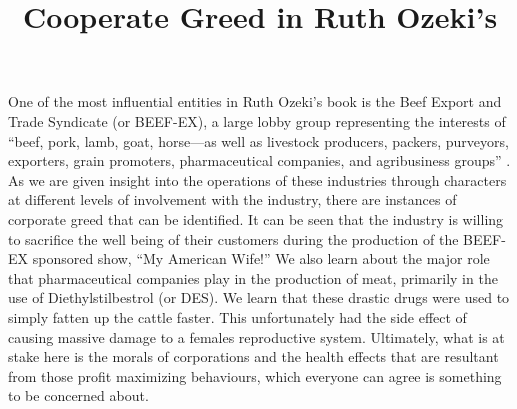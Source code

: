 \documentclass{article}
\title{Cooperate Greed in Ruth Ozeki's \citetitle{ozeki1998my}}
\begin{document}
\makeheader

One of the most influential entities in Ruth Ozeki's book
 is the Beef Export and Trade Syndicate (or BEEF-EX),
a large lobby group representing the interests of ``beef, pork, lamb, goat,
horse—as well as livestock producers, packers, purveyors, exporters, grain
promoters, pharmaceutical companies, and agribusiness groups''
\cite[Ch. 1]{ozeki1998my}. As we are given insight into the operations of these
industries through characters at different levels of involvement with the
industry, there are instances of corporate greed that can be identified. It
can be seen that the industry is willing to sacrifice the well being of
their customers during the production of the BEEF-EX sponsored show, ``My
American Wife!'' We also learn about the major role that pharmaceutical
companies play in the production of meat, primarily in the use of
Diethylstilbestrol (or DES). We learn that these drastic drugs were used to
simply fatten up the cattle faster. This unfortunately had the side effect
of causing massive damage to a females reproductive system. Ultimately, what
is at stake here is the morals of corporations and the health effects that
are resultant from those profit maximizing behaviours, which everyone can
agree is something to be concerned about.

\end{document}
